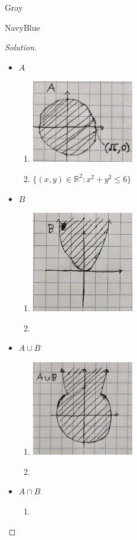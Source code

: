 \documentclass[12pt]{amsart}
\theoremstyle{named}
\newenvironment{soln}
{\begin{color}{Gray}\begin{framed}\begin{color}{NavyBlue}\begin{proof}[Solution]
\doublespacing}
{\end{proof}\end{color}\end{framed}\end{color}}
\theoremstyle{definition}
\begin{document}
\begin{soln}
    \phantom{ }
	\begin{itemize}
        \item $A$
		\begin{enumerate}
			\item \phantom{ }
			
			\includegraphics[width=12em]{media/A.png}
			\item $\{(x,y) \in \mathbb R^2 : x^2 + y^2 \leq 6\}$
		\end{enumerate}
	    \item $B$
	    \begin{enumerate}
			\item \phantom{ }
			
			\includegraphics[width=12em]{media/B.png}
			\item
		\end{enumerate}

		\phantom{ }

	    \item $A \cup B$
	    \begin{enumerate}
			\item \phantom{ }
			
			\includegraphics[width=12em]{media/A_cup_B.png}
			\item
		\end{enumerate}
	    \item $A \cap B$
	    \begin{enumerate}
			\item \phantom{ }
			

\end{enumerate}
\end{itemize}
\end{soln}
\end{document}
